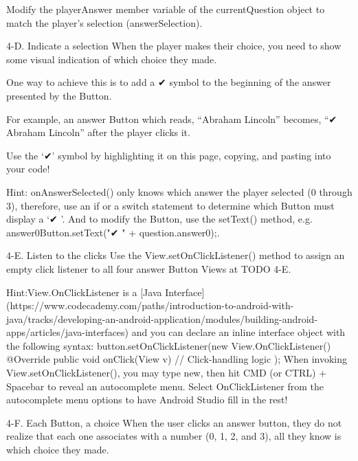                 Modify the playerAnswer member variable of the currentQuestion object to match the player’s selection (answerSelection).

        4-D. Indicate a selection
                When the player makes their choice, you need to show some visual indication of which choice they made.

                One way to achieve this is to add a ✔ symbol to the beginning of the answer presented by the Button.

                For example, an answer Button which reads, “Abraham Lincoln” becomes, “✔ Abraham Lincoln” after the player clicks it.

                Use the ‘✔’ symbol by highlighting it on this page, copying, and pasting into your code!

                        Hint: onAnswerSelected() only knows which answer the player selected (0 through 3), therefore, use an if or a switch statement to determine which Button must display a ‘✔ ’.
                        And to modify the Button, use the setText() method, e.g. answer0Button.setText("✔ " + question.answer0);.

        4-E. Listen to the clicks
                Use the View.setOnClickListener() method to assign an empty click listener to all four answer Button Views at TODO 4-E.

                        Hint:View.OnClickListener is a [Java Interface](https://www.codecademy.com/paths/introduction-to-android-with-java/tracks/developing-an-android-application/modules/building-android-apps/articles/java-interfaces) and you can declare an inline interface object with the following syntax:
                                button.setOnClickListener(new View.OnClickListener() {
                                        @Override
                                        public void onClick(View v) {
                                                // Click-handling logic
                                        }
                                });
                        When invoking View.setOnClickListener(), you may type new, then hit CMD (or CTRL) + Spacebar to reveal an autocomplete menu.
                        Select OnClickListener from the autocomplete menu options to have Android Studio fill in the rest!

        4-F. Each Button, a choice
                When the user clicks an answer button, they do not realize that each one associates with a number (0, 1, 2, and 3), all they know is which choice they made.


